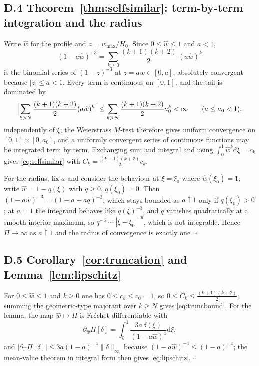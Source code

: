 \documentclass[11pt,a4paper]{article}
\newcommand{\dd}{\mathrm{d}}
\begin{document}
\subsection*{D.4 Theorem~\ref{thm:selfsimilar}: term-by-term integration and the radius}

Write $\hat w$ for the profile and $a=w_{\max}/H_0$. Since $0\le\hat w\le1$ and $a<1$,
\begin{equation}
(1-a\hat w)^{-3}=\sum_{k\ge0}\frac{(k+1)(k+2)}{2}\,(a\hat w)^k
\label{eq:D7}
\end{equation}
is the binomial series of $(1-z)^{-3}$ at $z=a\hat w\in[0,a]$, absolutely convergent because
$|z|\le a<1$. Every term is continuous on $[0,1]$, and the tail is dominated by
\begin{equation}
\Bigl|\sum_{k>N}\frac{(k+1)(k+2)}{2}(a\hat w)^k\Bigr|
\le\sum_{k>N}\frac{(k+1)(k+2)}{2}a_0^k<\infty\qquad(a\le a_0<1),
\label{eq:D8}
\end{equation}
independently of $\xi$; the Weierstrass $M$-test therefore gives uniform convergence on
$[0,1]\times[0,a_0]$, and a uniformly convergent series of continuous functions may be
integrated term by term. Exchanging sum and integral and using
$\int_0^1\hat w^k\dd\xi=c_k$ gives \eqref{eq:selfsimilar} with
$C_k=\frac{(k+1)(k+2)}{2}c_k$.

For the radius, fix $a$ and consider the behaviour at $\xi=\xi_0$ where $\hat w(\xi_0)=1$;
write $\hat w=1-q(\xi)$ with $q\ge0$, $q(\xi_0)=0$. Then $(1-a\hat w)^{-3}=(1-a+aq)^{-3}$,
which stays bounded as $a\uparrow1$ only if $q(\xi_0)>0$; at $a=1$ the integrand behaves like
$q(\xi)^{-3}$, and $q$ vanishes quadratically at a smooth interior maximum, so
$q^{-3}\sim|\xi-\xi_0|^{-6}$, which is not integrable. Hence $\Pi\to\infty$ as $a\uparrow1$ and
the radius of convergence is exactly one. $\square$

\subsection*{D.5 Corollary~\ref{cor:truncation} and Lemma~\ref{lem:lipschitz}}

For $0\le\hat w\le1$ and $k\ge0$ one has $0\le c_k\le c_0=1$, so
$0\le C_k\le\frac{(k+1)(k+2)}{2}$; summing the geometric-type majorant over $k\ge N$ gives
\eqref{eq:truncbound}. For the lemma, the map $\hat w\mapsto\Pi$ is Fr\'echet differentiable
with
\begin{equation}
\partial_{\hat w}\Pi[\delta]=\int_0^1\frac{3a\,\delta(\xi)}{(1-a\hat w)^4}\dd\xi ,
\label{eq:D9}
\end{equation}
and $|\partial_{\hat w}\Pi[\delta]|\le3a(1-a)^{-4}\|\delta\|_\infty$ because
$(1-a\hat w)^{-4}\le(1-a)^{-4}$; the mean-value theorem in integral form then gives
\eqref{eq:lipschitz}. $\square$
\end{document}
